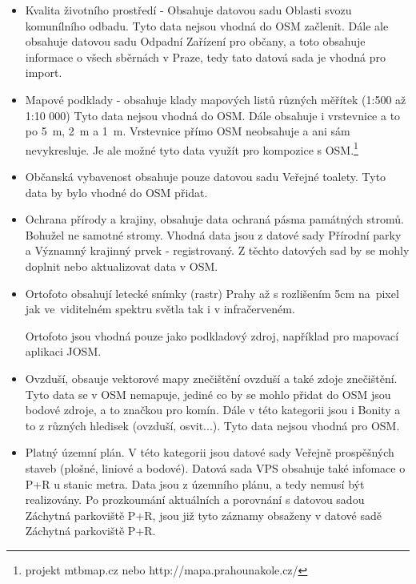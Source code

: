 \begin{itemize}
    \item   Kvalita životního prostředí - Obsahuje datovou sadu Oblasti svozu komunílního odbadu.
            Tyto data nejsou vhodná do OSM začlenit. Dále ale obsahuje datovou sadu
            Odpadní Zařízení pro občany, a toto obsahuje informace o všech sběrnách v Praze,
            tedy tato datová sada je vhodná pro import.

    \item   Mapové podklady - obsahuje klady mapových listů různých měřítek (1:500 až 1:10 000)
            Tyto data nejsou vhodná do OSM. Dále obsahuje i vrstevnice a to po
            5~m, 2~m a 1~m. Vrstevnice přímo OSM neobsahuje a ani sám nevykresluje.
            Je ale možné tyto data využít pro kompozice s OSM.\footnote{projekt mtbmap.cz nebo http://mapa.prahounakole.cz/}

    \item   Občanská vybavenost obsahuje pouze datovou sadu Veřejné toalety.
            Tyto data by bylo vhodné do OSM přidat.

    \item   Ochrana přírody a krajiny, obsahuje data ochraná pásma památných stromů.
            Bohužel ne samotné stromy. Vhodná data jsou z datové sady Přírodní parky a
            Významný krajinný prvek - registrovaný. Z těchto datových sad by se mohly
            doplnit nebo aktualizovat data v OSM.

    \item   Ortofoto obsahují letecké snímky (rastr) Prahy až s rozlišením 5cm
            na~pixel jak ve~viditelném spektru světla tak i v infračerveném.

            Ortofoto jsou vhodná pouze jako podkladový zdroj,
            například pro mapovací aplikaci JOSM.

    \item   Ovzduší, obsauje vektorové mapy znečištění ovzduší a také
            zdoje znečištění. Tyto data se v OSM nemapuje, jediné co by se
            mohlo přidat do OSM jsou bodové zdroje, a to značkou pro komín.
            Dále v této kategorii jsou i Bonity a to z různých hledisek (ovzduší, osvit...).
            Tyto data nejsou vhodná pro OSM.

    \item   Platný územní plán. V této kategorii jsou datové sady Veřejně prospěšných staveb
            (plošné, liniové a bodové). Datová sada VPS obsahuje také infomace o P+R u stanic metra.
            Data jsou z územního plánu, a tedy nemusí být realizovány.
            Po prozkoumání aktuálních a porovnání s datovou sadou Záchytná parkoviště P+R,
            jsou již tyto záznamy obsaženy v datové sadě Záchytná parkoviště P+R.


\end{itemize}
